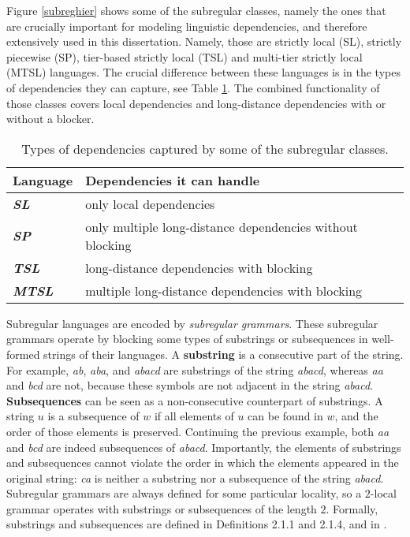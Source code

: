 Figure \ref{subreghier} shows some of the subregular classes, namely the ones that are crucially important for modeling linguistic dependencies, and therefore extensively used in this dissertation.
Namely, those are strictly local (SL), strictly piecewise (SP), tier-based strictly local (TSL) and multi-tier strictly local (MTSL) languages.
The crucial difference between these languages is in the types of dependencies they can capture, see Table \ref{subregclasses}.
The combined functionality of those classes covers local dependencies and long-distance dependencies with or without a blocker.


\begin{table}[h!]
\begin{center}
\begin{tabular}{|l|l|}
\hline
\textbf{Language}      & \textbf{Dependencies it can handle}                       \\ \hline
\textit{\textbf{SL}}   & only local dependencies                                   \\ \hline
\textit{\textbf{SP}}   & only multiple long-distance dependencies without blocking \\ \hline
\textit{\textbf{TSL}}  & long-distance dependencies with blocking                  \\ \hline
\textit{\textbf{MTSL}} & multiple long-distance dependencies with blocking         \\ \hline
\end{tabular}
\caption{Types of dependencies captured by some of the subregular classes.}
\label{subregclasses}
\end{center}
\end{table}



Subregular languages are encoded by \emph{subregular grammars}.
These subregular grammars operate by blocking some types of substrings or subsequences in well-formed strings of their languages.
A \textbf{substring} is a consecutive part of the string.
For example, \emph{ab}, \emph{aba}, and \emph{abacd} are substrings of the string \emph{abacd}, whereas \emph{aa} and \emph{bcd} are not, because these symbols are not adjacent in the string \emph{abacd}.
\textbf{Subsequences} can be seen as a non-consecutive counterpart of substrings.
A string $u$ is a subsequence of $w$ if all elements of $u$ can be found in $w$, and the order of those elements is preserved.
Continuing the previous example, both \emph{aa} and \emph{bcd} are indeed subsequences of \emph{abacd}.
Importantly, the elements of substrings and subsequences cannot violate the order in which the elements appeared in the original string: \emph{ca} is neither a substring nor a subsequence of the string \emph{abacd}.
Subregular grammars are always defined for some particular locality, so a $2$-local grammar operates with substrings or subsequences of the length $2$.
Formally, substrings and subsequences are defined in Definitions 2.1.1 and 2.1.4, and in \citep[a.o.]{ElzingaEtAl2008,Rogers-HeinzEtAl-2010-LPTSS,Fu2011}.

